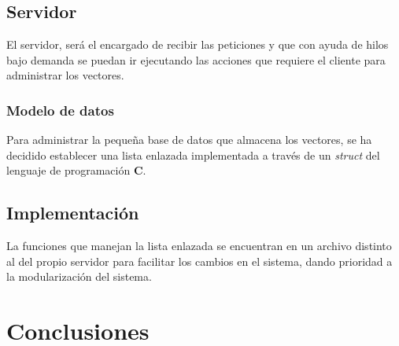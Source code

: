 \documentclass[10pt, spanish, pdftex]{template/UC3M_document}
\begin{document}
\subsection{Servidor}
El servidor, será el encargado de recibir las peticiones y que con ayuda de hilos bajo demanda se puedan ir ejecutando las acciones que requiere el cliente para administrar los vectores.
\subsubsection{Modelo de datos}
Para administrar la pequeña base de datos que almacena los vectores, se ha decidido establecer una lista enlazada implementada a través de un \textit{struct} del lenguaje de programación \textbf{C}.
\subsection{Implementación}
La funciones que manejan la lista enlazada se encuentran en un archivo distinto al del propio servidor para facilitar los cambios en el sistema, dando prioridad a la modularización del sistema.






\newpage
\section{Conclusiones}
\end{document}

